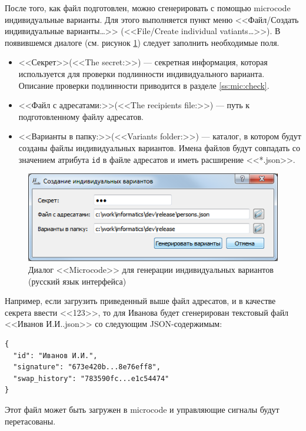После того, как файл подготовлен, можно сгенерировать с помощью microcode индивидуальные варианты. Для этого выполняется пункт меню <<Файл/Создать индивидуальные варианты\ldots>> (<<File/Create individual vatiants\ldots>>). В появившемся диалоге (см. рисунок \ref{fig:mic:genvariants}) следует заполнить необходимые поля.
\begin{itemize}
    \item <<Секрет>>(<<The secret:>>) --- секретная информация, которая используется для проверки подлинности индивидуального варианта. Описание проверки подлинности приводится в разделе \ref{ss:mic:check}.
    
    \item <<Файл с адресатами:>>(<<The recipients file:>>) --- путь к подготовленному файлу адресатов.
    
    \item <<Варианты в папку:>>(<<Variants folder:>>) --- каталог, в котором будут созданы файлы индивидуальных вариантов. Имена файлов будут совпадать со значением атрибута \verb"id" в файле адресатов и иметь расширение <<*.json>>.
\end{itemize}

\begin{figure}[!ht]
    \centering
    \includegraphics{fig/micvariants}
    \caption{Диалог <<Microcode>> для генерации индивидуальных вариантов (русский язык интерфейса)}\label{fig:mic:genvariants}
\end{figure}

Например, если загрузить приведенный выше файл адресатов, и в качестве секрета ввести <<123>>, то для Иванова будет сгенерирован текстовый файл <<Иванов И.И..json>> со следующим JSON-содержимым:

\begin{verbatim}
{
  "id": "Иванов И.И.",
  "signature": "673e420b...8e76eff8",
  "swap_history": "783590fc...e1c54474"
}
\end{verbatim}

Этот файл может быть загружен в microcode и управляющие сигналы будут перетасованы.


